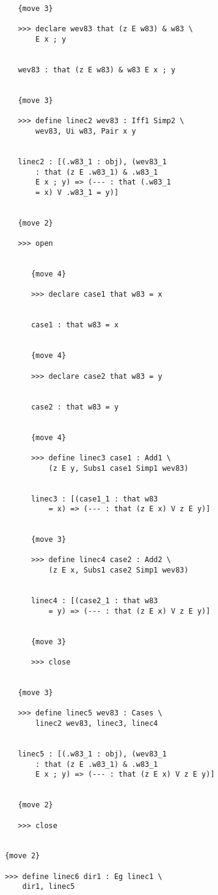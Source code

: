 \documentclass[12pt]{article}
\begin{document}
\begin{verbatim}
         {move 3}

         >>> declare wev83 that (z E w83) & w83 \
             E x ; y


         wev83 : that (z E w83) & w83 E x ; y


         {move 3}

         >>> define linec2 wev83 : Iff1 Simp2 \
             wev83, Ui w83, Pair x y


         linec2 : [(.w83_1 : obj), (wev83_1 
             : that (z E .w83_1) & .w83_1 
             E x ; y) => (--- : that (.w83_1 
             = x) V .w83_1 = y)]


         {move 2}

         >>> open


            {move 4}

            >>> declare case1 that w83 = x


            case1 : that w83 = x


            {move 4}

            >>> declare case2 that w83 = y


            case2 : that w83 = y


            {move 4}

            >>> define linec3 case1 : Add1 \
                (z E y, Subs1 case1 Simp1 wev83)


            linec3 : [(case1_1 : that w83 
                = x) => (--- : that (z E x) V z E y)]


            {move 3}

            >>> define linec4 case2 : Add2 \
                (z E x, Subs1 case2 Simp1 wev83)


            linec4 : [(case2_1 : that w83 
                = y) => (--- : that (z E x) V z E y)]


            {move 3}

            >>> close


         {move 3}

         >>> define linec5 wev83 : Cases \
             linec2 wev83, linec3, linec4


         linec5 : [(.w83_1 : obj), (wev83_1 
             : that (z E .w83_1) & .w83_1 
             E x ; y) => (--- : that (z E x) V z E y)]


         {move 2}

         >>> close


      {move 2}

      >>> define linec6 dir1 : Eg linec1 \
          dir1, linec5



\end{verbatim}
\end{document}
